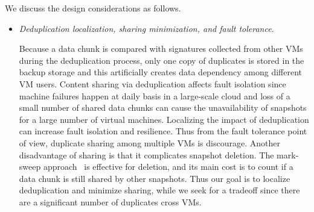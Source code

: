 We discuss the design considerations as follows. 
\begin{itemize}
\item {\em Deduplication localization, sharing minimization, and fault tolerance.}

Because a data chunk is compared with signatures collected from other VMs during
the deduplication process, only one copy of duplicates is stored in the backup storage
and this artificially creates data dependency among different VM users. 
Content sharing via deduplication affects fault isolation since machine failures happen at daily 
basis in a large-scale cloud and
loss of a small number of shared data chunks can 
cause the unavailability of snapshots for a large number of virtual machines.
Localizing the impact of deduplication can increase fault isolation and resilience.
Thus from the fault tolerance point of view,  duplicate sharing among multiple VMs is 
discourage. 
Another disadvantage of sharing is that it complicates snapshot deletion.
The mark-sweep approach~\cite{mark-sweep} is effective for deletion, and its main cost
is to count if a data chunk is still shared by other snapshots.
Thus our goal is to localize deduplication and minimize sharing, while we seek for 
a tradeoff since there are a significant number of duplicates cross VMs.
 

\end{itemize}

